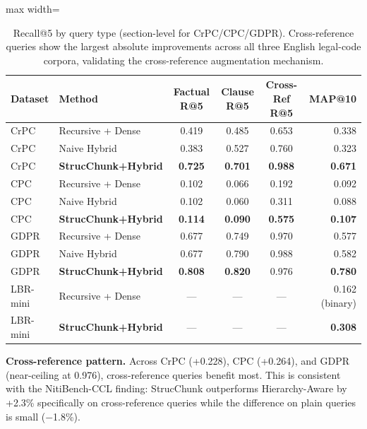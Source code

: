 \documentclass[sn-mathphys,Numbered]{sn-jnl}%
\begin{document}
\begin{table}[htbp]
\centering
\begin{adjustbox}{max width=\textwidth}
\begin{tabular}{llcccr}
\toprule
\textbf{Dataset} & \textbf{Method}
  & \textbf{Factual R@5} & \textbf{Clause R@5}
  & \textbf{Cross-Ref R@5} & \textbf{MAP@10} \\
\midrule
CrPC & Recursive + Dense         & 0.419 & 0.485 & 0.653 & 0.338 \\
CrPC & Naive Hybrid              & 0.383 & 0.527 & 0.760 & 0.323 \\
CrPC & \textbf{StrucChunk+Hybrid}& \textbf{0.725} & \textbf{0.701}
                                 & \textbf{0.988} & \textbf{0.671} \\
\midrule
CPC  & Recursive + Dense         & 0.102 & 0.066 & 0.192 & 0.092 \\
CPC  & Naive Hybrid              & 0.102 & 0.060 & 0.311 & 0.088 \\
CPC  & \textbf{StrucChunk+Hybrid}& \textbf{0.114} & \textbf{0.090}
                                 & \textbf{0.575} & \textbf{0.107} \\
\midrule
GDPR & Recursive + Dense         & 0.677 & 0.749 & 0.970 & 0.577 \\
GDPR & Naive Hybrid              & 0.677 & 0.790 & 0.988 & 0.582 \\
GDPR & \textbf{StrucChunk+Hybrid}& \textbf{0.808} & \textbf{0.820}
                                 & 0.976 & \textbf{0.780} \\
\midrule
LBR-mini & Recursive + Dense     & --- & --- & --- & 0.162 (binary) \\
LBR-mini & \textbf{StrucChunk+Hybrid} & --- & --- & --- & \textbf{0.308} \\
\bottomrule
\end{tabular}
\end{adjustbox}
\caption{Recall@5 by query type (section-level for CrPC/CPC/GDPR).
  Cross-reference queries show the largest absolute improvements across all
  three English legal-code corpora, validating the cross-reference
  augmentation mechanism.}
\label{tab:query_type_results}
\end{table}

\textbf{Cross-reference pattern.}  Across CrPC (+0.228), CPC (+0.264),
and GDPR (near-ceiling at 0.976), cross-reference queries benefit most.
This is consistent with the NitiBench-CCL finding: StrucChunk outperforms
Hierarchy-Aware by +2.3\% specifically on cross-reference queries while
the difference on plain queries is small ($-$1.8\%).
\end{document}
